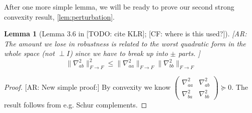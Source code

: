 \documentclass{article}
\newtheorem{lemma}[theorem]{Lemma}
\newcommand\tr{\operatorname{Tr}}
\newcommand{\CF}[1]{{\color{purple}[CF: #1]}}
\newcommand{\AR}[1]{{\color{orange}[AR: #1]}}
\newcommand{\TODO}[1]{{\color{blue}[TODO: #1]}}
\begin{document}
After one more simple lemma, we will be ready to prove our second strong convexity result, \cref{lem:perturbation}.
\begin{lemma} [Lemma 3.6 in \TODO{cite KLR}; \CF{where is this used?}]
\AR{The amount we lose in robustness is related to the worst quadratic form in the whole space (not $\perp I$) since we have to break up into $\pm$ parts. }
\[ \|\nabla_{ab}^{2}\|_{F \to F}^{2} \leq \|\nabla_{aa}^{2}\|_{F \to F} \|\nabla_{bb}^{2}\|_{F \to F}   \]
\end{lemma}
\begin{proof}
\AR{New simple proof:} By convexity we know $\begin{pmatrix} \nabla_{aa}^{2} & \nabla_{ab}^{2} \\ \nabla_{ba}^{2} & \nabla_{bb}^{2}  \end{pmatrix} \succeq 0$. The result follows from e.g. Schur complements. 
\end{proof}








\end{document}
